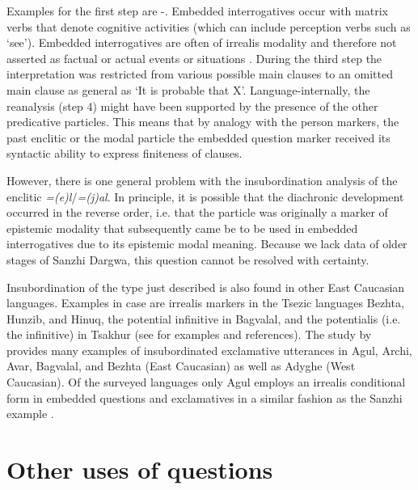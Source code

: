 Examples for the first step are -. Embedded interrogatives occur with matrix verbs that denote cognitive activities (which can include perception verbs such as ‘see'). Embedded interrogatives are often of irrealis modality and therefore not asserted as factual or actual events or situations . During the third step the interpretation was restricted from various possible main clauses to an omitted main clause as general as ‘It is probable that X'. Language-internally, the reanalysis (step 4) might have been supported by the presence of the other predicative particles. This means that by analogy with the person markers, the past enclitic or the modal particle the embedded question marker received its syntactic ability to express finiteness of clauses.

However, there is one general problem with the insubordination analysis of the enclitic \textit{=(e)l}\slash\textit{=(j)al}. In principle, it is possible that the diachronic development occurred in the reverse order, i.e. that the particle was originally a marker of epistemic modality that subsequently came be to be used in embedded interrogatives due to its epistemic modal meaning. Because we lack data of older stages of Sanzhi Dargwa, this question cannot be resolved with certainty.

Insubordination of the type just described is also found in other East Caucasian languages. Examples in case are irrealis markers in the Tsezic languages Bezhta, Hunzib, and Hinuq, the potential infinitive in Bagvalal, and the potentialis (i.e. the infinitive) in Tsakhur (see \citet{ComrieForkerKhalilova2016} for examples and references). The study by \citep{Kalinina2011} provides many examples of insubordinated exclamative utterances in Agul, Archi, Avar, Bagvalal, and Bezhta (East Caucasian) as well as Adyghe (West Caucasian). Of the surveyed languages only Agul employs an irrealis conditional form in embedded questions and exclamatives in a similar fashion as the Sanzhi example .







\section{Other uses of questions}
\label{sec:Other uses of questions}

